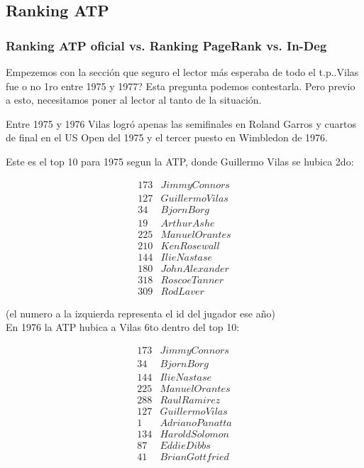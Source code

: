 \subsection{Ranking ATP}

\subsubsection{Ranking ATP oficial vs. Ranking PageRank vs. In-Deg}

Empezemos con la sección que seguro el lector más esperaba de todo el t.p..Vilas fue o no 1ro entre 1975 y 1977? Esta pregunta podemos contestarla. Pero previo a esto, necesitamos poner al lector al tanto de la situación.


Entre 1975 y 1976 Vilas logró apenas las semifinales en Roland Garros y cuartos de final en el US Open del 1975 y el tercer puesto en Wimbledon de 1976.


Este es el top 10 para 1975 segun la ATP, donde Guillermo Vilas se hubica 2do:

\begin{eqnarray*}
173 & Jimmy Connors \\
127 & Guillermo Vilas \\
34 & Bjorn Borg \\
19 & Arthur Ashe \\
225 & Manuel Orantes \\
210 & Ken Rosewall \\
144 & Ilie Nastase \\
180 & John Alexander \\
318 & Roscoe Tanner \\
309 & Rod Laver 
\end{eqnarray*}

(el numero a la izquierda representa el id del jugador ese año)\\


En 1976 la ATP hubica a Vilas 6to dentro del top 10:

\begin{eqnarray*}
173 & Jimmy Connors \\
34 & Bjorn Borg \\
144 & Ilie Nastase \\
225 & Manuel Orantes \\
288 & Raul Ramirez \\
127 & Guillermo Vilas \\
1 & Adriano Panatta \\
134 & Harold Solomon \\
87 & Eddie Dibbs \\
41 & Brian Gottfried 
\end{eqnarray*}


